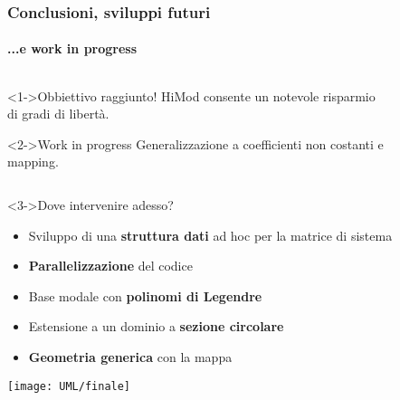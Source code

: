 \begin{frame}
 \frametitle{Conclusioni, sviluppi futuri}
 \framesubtitle{...e work in progress}
 \begin{columns}
  \begin{column}{0.5\textwidth}
    \begin{exampleblock}<1->{Obbiettivo raggiunto!}
    HiMod consente un notevole risparmio di gradi di libert\`a.
    \end{exampleblock}
    \begin{alertblock}<2->{Work in progress}
    Generalizzazione a coefficienti non costanti e mapping.
    \end{alertblock}
  \end{column}

  \begin{column}{0.5\textwidth}
   \begin{figure}
   \centering
    {}
   \end{figure}
  \end{column}
 \end{columns}
 
 \begin{block}<3->{Dove intervenire adesso?}
\begin{itemize}
\footnotesize	
    \item<4-> Sviluppo di una \textbf{struttura dati} ad hoc per la matrice di sistema
    \item<5-> \textbf{Parallelizzazione} del codice
    \item<6-> Base modale con \textbf{polinomi di Legendre}
    \item<7-> Estensione a un dominio a \textbf{sezione circolare}
    \item<8-> \textbf{Geometria generica} con la mappa
   \end{itemize}
   \end{block}
\end{frame}
\begin{frame}
 \texttt{[image: UML/finale]}
 \end{frame}
